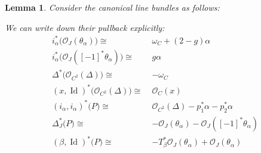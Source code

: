 \documentclass[reqno,11pt]{amsart}
\numberwithin{equation}{section}
\theoremstyle{plain}
\newtheorem{lemma}[theorem]{Lemma}
\theoremstyle{plain}
\numberwithin{equation}{section}
\theoremstyle{remark}
\DeclareMathOperator{\Id}{\operatorname{Id}}
\begin{document}
\begin{lemma}
Consider the canonical line bundles as follows:
\begin{center}
\end{center}
We can write down their pullback explicitly:
\begin{subequations}
\begin{alignat}{1}
  i_{\alpha}^* \Big(\mathcal{O}_J(\theta_{\alpha}) \Big)\cong\;& \omega_C+(2-g)\alpha  \\ 
  i_{\alpha}^* \Big(\mathcal{O}_J([-1]^* \theta_{\alpha}) \Big)\cong\;& g\alpha \\   \label{subeq:alpha}
  \Delta^* \Big(\mathcal{O}_{C^2}(\Delta) \Big)\cong\;& -\omega_C \\ 
  (x,\Id)^* \Big(\mathcal{O}_{C^2}(\Delta) \Big)\cong\;& \mathcal{O}_C(x) \\  
  (i_{\alpha},i_{\alpha})^* \big(P\big)\cong\;&  \mathcal{O}_{C^2}(\Delta)-p_1^*\alpha-p_2^*\alpha\\ \label{subeq:delta} 
  \Delta_J^* \big(P\big)\cong\;&-\mathcal{O}_J(\theta_{\alpha})- \mathcal{O}_J([-1]^* \theta_{\alpha}) \\ 
  (\beta,\Id)^* \big(P\big)\cong\;& -T_{\beta}^*\mathcal{O}_J(\theta_{\alpha})+\mathcal{O}_J(\theta_{\alpha}) 
\end{alignat}
\end{subequations}
\end{lemma}
\end{document}
